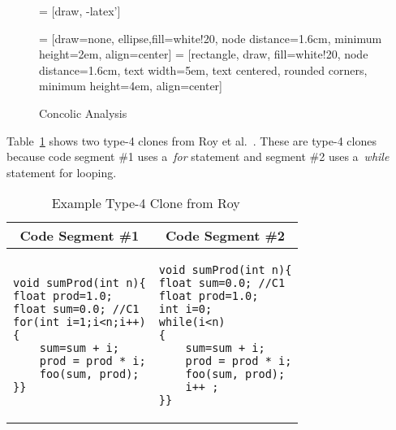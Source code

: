 \documentclass{sig-alternate}
\begin{document}
\begin{figure}[h] %

\begin{center}
 = [draw, -latex']

 = [draw=none, ellipse,fill=white!20, node distance=1.6cm, minimum height=2em, align=center]
 = [rectangle, draw, fill=white!20, node distance=1.6cm, text width=5em, text centered, rounded corners, minimum height=4em, align=center]
\caption{Concolic Analysis}
\label{fig:comprocess}
\end{center}
\end{figure}


Table~\ref{table:royclones} shows two type-4 clones from Roy et al.~\cite{Roy:2009:CEC:1530898.1531101}. These are type-4 clones because code segment \#1 uses a~\emph{for} statement and segment \#2 uses a~\emph{while} statement for looping.


\noindent
\begin{table}[h] %
\centering
\caption{Example Type-4 Clone from Roy~\cite{Roy:2009:CEC:1530898.1531101}~\label{table:royclones}}
\begin{tabular}{ p{3.8cm} | p{3.8cm} }
\multicolumn{1}{c}{\textbf{Code Segment \#1}} & \multicolumn{1}{c}{\textbf{Code Segment \#2}} \\ \hline \hline
\begin{lstlisting}
void sumProd(int n){
float prod=1.0;
float sum=0.0; //C1
for(int i=1;i<n;i++)
{
    sum=sum + i;
    prod = prod * i;
    foo(sum, prod);
}}
\end{lstlisting}
&
\begin{lstlisting}
void sumProd(int n){
float sum=0.0; //C1
float prod=1.0;
int i=0;
while(i<n)
{
    sum=sum + i;
    prod = prod * i;
    foo(sum, prod);
    i++ ;
}}
\end{lstlisting}
\end{tabular}
\end{table}
\end{document}
